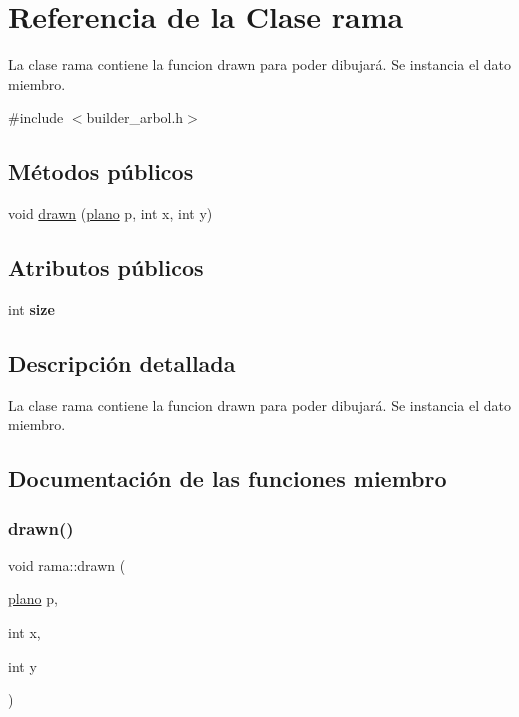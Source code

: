 \hypertarget{classrama}{}\section{Referencia de la Clase rama}
\label{classrama}


La clase rama contiene la funcion drawn para poder dibujará.  Se instancia el dato miembro.  




{\ttfamily \#include $<$builder\+\_\+arbol.\+h$>$}

\subsection*{Métodos públicos}
\begin{DoxyCompactItemize}
\item 
void \hyperlink{classrama_a2b4b067ff7da51ec0db012b6162ab6f1}{drawn} (\hyperlink{classplano}{plano} p, int x, int y)
\end{DoxyCompactItemize}
\subsection*{Atributos públicos}
\begin{DoxyCompactItemize}
\item 
\mbox{\label{classrama_a86bc8fa67daee270412e4b472ba24511}} 
int {\bfseries size}
\end{DoxyCompactItemize}


\subsection{Descripción detallada}
La clase rama contiene la funcion drawn para poder dibujará.  Se instancia el dato miembro. 

\subsection{Documentación de las funciones miembro}
\mbox{\label{classrama_a2b4b067ff7da51ec0db012b6162ab6f1}} 
\subsubsection{\texorpdfstring{drawn()}{drawn()}}
{\footnotesize\ttfamily void rama\+::drawn (\begin{DoxyParamCaption}\item[{\hyperlink{classplano}{plano}}]{p,  }\item[{int}]{x,  }\item[{int}]{y }\end{DoxyParamCaption})}

